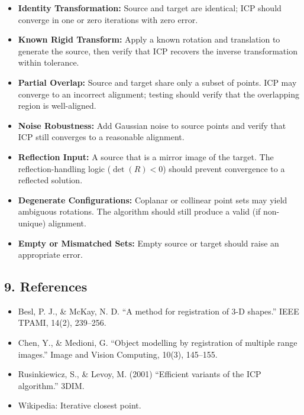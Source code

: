 \begin{itemize}
    \item \textbf{Identity Transformation:} Source and target are identical; ICP should converge in one or zero iterations with zero error.
    \item \textbf{Known Rigid Transform:} Apply a known rotation and translation to generate the source, then verify that ICP recovers the inverse transformation within tolerance.
    \item \textbf{Partial Overlap:} Source and target share only a subset of points. ICP may converge to an incorrect alignment; testing should verify that the overlapping region is well-aligned.
    \item \textbf{Noise Robustness:} Add Gaussian noise to source points and verify that ICP still converges to a reasonable alignment.
    \item \textbf{Reflection Input:} A source that is a mirror image of the target. The reflection-handling logic ($\det(R) < 0$) should prevent convergence to a reflected solution.
    \item \textbf{Degenerate Configurations:} Coplanar or collinear point sets may yield ambiguous rotations. The algorithm should still produce a valid (if non-unique) alignment.
    \item \textbf{Empty or Mismatched Sets:} Empty source or target should raise an appropriate error.
\end{itemize}

\subsection{9. References}

\begin{itemize}
    \item Besl, P. J., \& McKay, N. D. \cite{besl1992} ``A method for registration of 3-D shapes.'' IEEE TPAMI, 14(2), 239--256.
    \item Chen, Y., \& Medioni, G. \cite{chen1992} ``Object modelling by registration of multiple range images.'' Image and Vision Computing, 10(3), 145--155.
    \item Rusinkiewicz, S., \& Levoy, M. (2001) ``Efficient variants of the ICP algorithm.'' 3DIM.
    \item Wikipedia: Iterative closest point.
\end{itemize}
